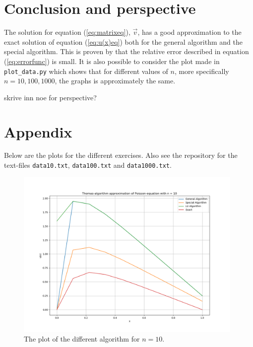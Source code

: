 \documentclass{article}
\begin{document}
\vspace{1cm}

\section{Conclusion and perspective} \label{Conclusion}

  The solution for equation (\ref{eq:matrixeq}), $\vec{v}$, has a good approximation to the exact solution of equation (\ref{eq:u(x)eq}) both for the general algorithm and the special algorithm. This is proven by that the relative error described in equation (\ref{eq:errorfunc}) is small. It is also possible to consider the plot made in \texttt{plot\_data.py} which shows that for different values of $n$, more specifically $n = 10, 100, 1000$, the graphs is approximately the same.

  {\large skrive inn noe for perspective? }


\vspace{1cm}

\section{Appendix} \label{Appendix}

Below are the plots for the different exercises. Also see the repository for the text-files \texttt{data10.txt}, \texttt{data100.txt} and \texttt{data1000.txt}.

\begin{figure}[ht]
	\centering
	\label{fig:data10png}
	\includegraphics[width = 11cm]{program/data10.png}
	\caption{The plot of the different algorithm for $n = 10$. }
\end{figure}
\end{document}
